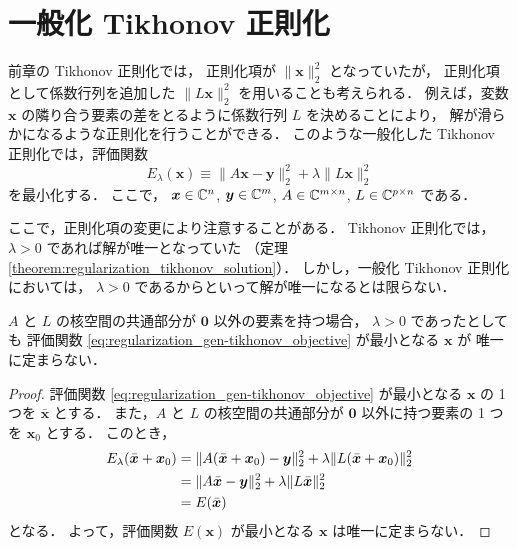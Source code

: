 %

\chapter{一般化 Tikhonov 正則化}

前章の Tikhonov 正則化では，
正則化項が $\|\bm{x}\|_2^2$ となっていたが，
正則化項として係数行列を追加した $\|L\bm{x}\|_2^2$ を用いることも考えられる．
例えば，変数 $\bm{x}$ の隣り合う要素の差をとるように係数行列 $L$ を決めることにより，
解が滑らかになるような正則化を行うことができる．
このような一般化した Tikhonov 正則化では，評価関数
\begin{equation}
    E_{\lambda}(\bm{x}) \equiv \|A \bm{x} - \bm{y}\|_2^2 + \lambda \|L \bm{x}\|_2^2
    \label{eq:regularization_gen-tikhonov_objective}
\end{equation}
を最小化する．
ここで，
$\bm{x} \in \mathbb{C}^n$,
$\bm{y} \in \mathbb{C}^m$,
$A \in \mathbb{C}^{m \times n}$,
$L \in \mathbb{C}^{p \times n}$
である．

ここで，正則化項の変更により注意することがある．
Tikhonov 正則化では，$\lambda > 0$ であれば解が唯一となっていた
（定理 \ref{theorem:regularization_tikhonov_solution}）．
しかし，一般化 Tikhonov 正則化においては，
$\lambda > 0$ であるからといって解が唯一になるとは限らない．

\begin{theorem}
    $A$ と $L$ の核空間の共通部分が $\bm{0}$ 以外の要素を持つ場合，
    $\lambda > 0$ であったとしても
    評価関数 \eqref{eq:regularization_gen-tikhonov_objective} が最小となる $\bm{x}$ が
    唯一に定まらない．
\end{theorem}
\begin{proof}
    評価関数 \eqref{eq:regularization_gen-tikhonov_objective} が最小となる
    $\bm{x}$ の 1 つを $\bar{\bm{x}}$ とする．
    また，$A$ と $L$ の核空間の共通部分が $\bm{0}$ 以外に持つ要素の 1 つを $\bm{x}_0$ とする．
    このとき，
    \begin{align}
        E_{\lambda}(\bar{\bm{x}} + \bm{x}_0)
         & = \|A (\bar{\bm{x}} + \bm{x}_0) - \bm{y}\|_2^2 + \lambda \|L (\bar{\bm{x}} + \bm{x}_0)\|_2^2
        \notag                                                                                          \\
         & = \|A \bar{\bm{x}} - \bm{y}\|_2^2 + \lambda \|L \bar{\bm{x}}\|_2^2
        \notag                                                                                          \\
         & = E(\bar{\bm{x}})
    \end{align}
    となる．
    よって，評価関数 $E(\bm{x})$ が最小となる $\bm{x}$ は唯一に定まらない．
\end{proof}

